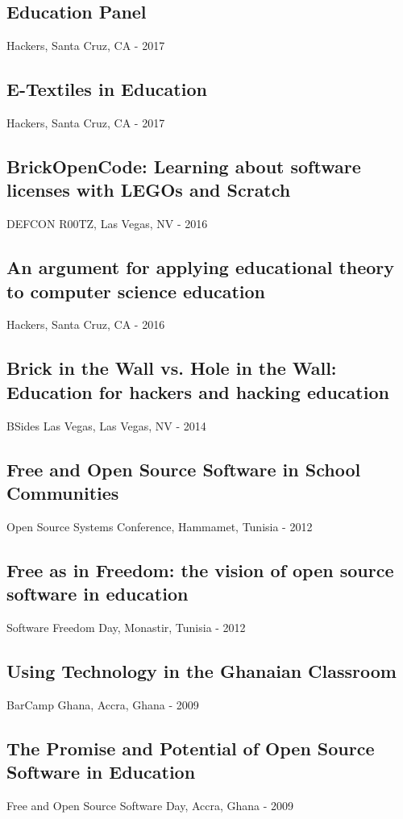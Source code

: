 \documentclass[../main.tex]{subfiles}
\begin{document}
\subsection*{Education Panel}
     Hackers, Santa Cruz, CA - 2017

\subsection*{E-Textiles in Education}
     Hackers, Santa Cruz, CA - 2017


\subsection*{BrickOpenCode: Learning about software licenses with LEGOs and Scratch}
 DEFCON R00TZ, Las Vegas, NV - 2016


\subsection*{An argument for applying educational theory to computer science education}
     Hackers, Santa Cruz, CA - 2016


\subsection*{Brick in the Wall vs. Hole in the Wall: Education for hackers and hacking education}
 BSides Las Vegas, Las Vegas, NV - 2014


\subsection*{Free and Open Source Software in School Communities}
 Open Source Systems Conference, Hammamet, Tunisia - 2012


\subsection*{Free as in Freedom: the vision of open source software in education}
 Software Freedom Day, Monastir, Tunisia - 2012


\subsection*{Using Technology in the Ghanaian Classroom}
 BarCamp Ghana, Accra, Ghana - 2009


\subsection*{The Promise and Potential of Open Source Software in Education}
 Free and Open Source Software Day, Accra, Ghana - 2009
\end{document}
